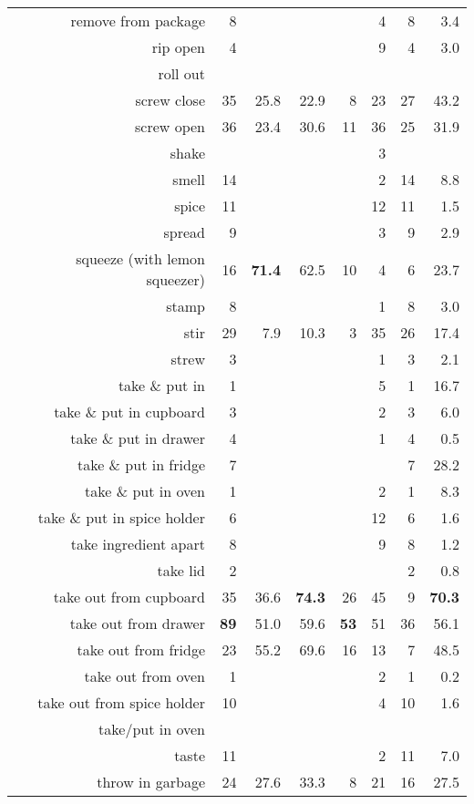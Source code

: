 \begin{tabular}{r r r@{\ \ }r@{\ \ }r@{\ \ }r@{\ \ }r r}
remove from package & 8 &  &  &  & 4 & 8 & 3.4 \\
rip open & 4 &  &  &  & 9 & 4 & 3.0 \\
roll out &  &  &  &  &  &  &  \\
screw close & 35 & 25.8 & 22.9 & 8 & 23 & 27 & 43.2 \\
screw open & 36 & 23.4 & 30.6 & 11 & 36 & 25 & 31.9 \\
shake &  &  &  &  & 3 &  &  \\
smell & 14 &  &  &  & 2 & 14 & 8.8 \\
spice & 11 &  &  &  & 12 & 11 & 1.5 \\
spread & 9 &  &  &  & 3 & 9 & 2.9 \\
squeeze (with lemon squeezer) & 16 & \textbf{71.4} & 62.5 & 10 & 4 & 6 & 23.7 \\
stamp & 8 &  &  &  & 1 & 8 & 3.0 \\
stir & 29 & 7.9 & 10.3 & 3 & 35 & 26 & 17.4 \\
strew & 3 &  &  &  & 1 & 3 & 2.1 \\
take \& put in  & 1 &  &  &  & 5 & 1 & 16.7 \\
take \& put in cupboard & 3 &  &  &  & 2 & 3 & 6.0 \\
take \& put in drawer & 4 &  &  &  & 1 & 4 & 0.5 \\
take \& put in fridge & 7 &  &  &  &  & 7 & 28.2 \\
take \& put in oven & 1 &  &  &  & 2 & 1 & 8.3 \\
take \& put in spice holder & 6 &  &  &  & 12 & 6 & 1.6 \\
take ingredient apart & 8 &  &  &  & 9 & 8 & 1.2 \\
take lid & 2 &  &  &  &  & 2 & 0.8 \\
take out from cupboard & 35 & 36.6 & \textbf{74.3} & 26 & 45 & 9 & \textbf{70.3} \\
take out from drawer & \textbf{89} & 51.0 & 59.6 & \textbf{53} & 51 & 36 & 56.1 \\
take out from fridge & 23 & 55.2 & 69.6 & 16 & 13 & 7 & 48.5 \\
take out from oven & 1 &  &  &  & 2 & 1 & 0.2 \\
take out from spice holder & 10 &  &  &  & 4 & 10 & 1.6 \\
take/put in oven &  &  &  &  &  &  &  \\
taste & 11 &  &  &  & 2 & 11 & 7.0 \\
throw in garbage & 24 & 27.6 & 33.3 & 8 & 21 & 16 & 27.5 \\

\end{tabular}
